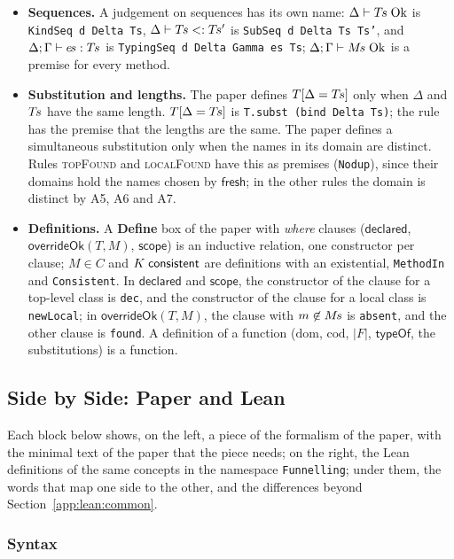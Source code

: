 \begin{itemize}
\decls is an explicit argument \texttt{d} of every judgement.
\item \textbf{Sequences.}
A judgement on sequences has its own name: $\Delta \vdash T\mkern-2mu s\mskip5mu\mathrm{Ok}$ is \texttt{KindSeq d Delta Ts}, $\Delta\vdash T\mkern-2mu s <: T\mkern-2mu s'$ is \texttt{SubSeq d Delta Ts Ts'}, and $\Delta;\Gamma\vdash e\mkern-2mu s : T\mkern-2mu s$ is \texttt{TypingSeq d Delta Gamma es Ts}; $\Delta;\Gamma\vdash M\mkern-2mu s\mskip5mu\mathrm{Ok}$ is a premise for every method.
\item \textbf{Substitution and lengths.}
The paper defines $T[\Delta=T\mkern-2mu s]$ only when $\Delta$ and $T\mkern-2mu s$ have the same length.
$T[\Delta=T\mkern-2mu s]$ is \texttt{T.subst (bind Delta Ts)}; the rule has the premise that the lengths are the same.
The paper defines a simultaneous substitution only when the names in its domain are distinct.
Rules \textsc{topFound} and \textsc{localFound} have this as premises (\texttt{Nodup}), since their domains hold the names chosen by $\mathsf{fresh}$; in the other rules the domain is distinct by A5, A6 and A7.
\item \textbf{Definitions.}
A \textbf{Define} box of the paper with \emph{where} clauses ($\mathsf{declared}$, $\mathsf{overrideOk}(T,M)$, $\mathsf{scope}$) is an inductive relation, one constructor per clause; $M\in C$ and $K\mskip5mu\mathsf{consistent}$ are definitions with an existential, \texttt{MethodIn} and \texttt{Consistent}.
In $\mathsf{declared}$ and $\mathsf{scope}$, the constructor of the clause for a top-level class is \texttt{dec}, and the constructor of the clause for a local class is \texttt{newLocal}; in $\mathsf{overrideOk}(T,M)$, the clause with $m\not\in M\mkern-2mu s$ is \texttt{absent}, and the other clause is \texttt{found}.
A definition of a function ($\mathrm{dom}$, $\mathrm{cod}$, $|F|$, $\mathsf{typeOf}$, the substitutions) is a function.
\end{itemize}

\subsection{Side by Side: Paper and Lean}
\label{app:lean:sidebyside}
Each block below shows, on the left, a piece of the formalism of the paper, with the minimal text of the paper that the piece needs; on the right, the Lean definitions of the same concepts in the namespace \texttt{Funnelling}; under them, the words that map one side to the other, and the differences beyond Section~\ref{app:lean:common}.

\subsubsection{Syntax}

